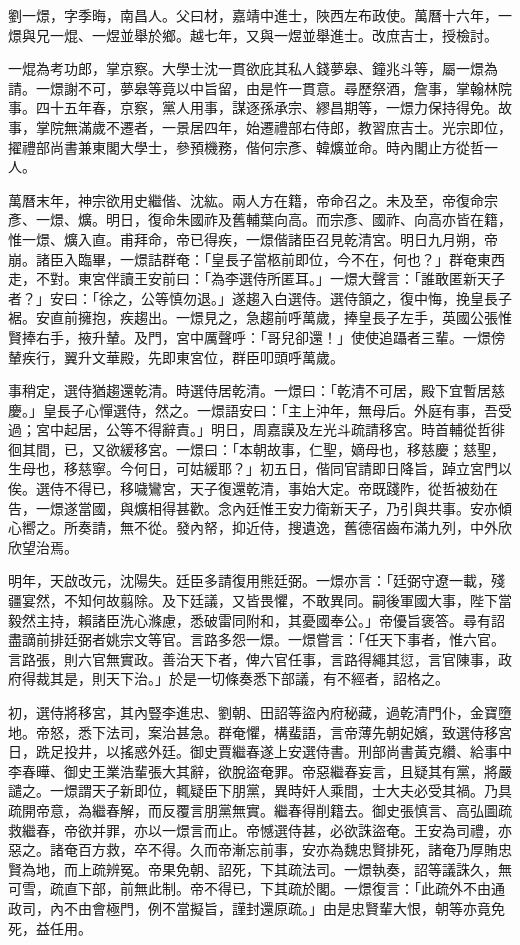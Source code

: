 \begin{pinyinscope}
劉一燝，字季晦，南昌人。父曰材，嘉靖中進士，陜西左布政使。萬曆十六年，一燝與兄一焜、一煜並舉於鄉。越七年，又與一煜並舉進士。改庶吉士，授檢討。

一焜為考功郎，掌京察。大學士沈一貫欲庇其私人錢夢皋、鐘兆斗等，屬一燝為請。一燝謝不可，夢皋等竟以中旨留，由是忤一貫意。尋歷祭酒，詹事，掌翰林院事。四十五年春，京察，黨人用事，謀逐孫承宗、繆昌期等，一燝力保持得免。故事，掌院無滿歲不遷者，一景居四年，始遷禮部右侍郎，教習庶吉士。光宗即位，擢禮部尚書兼東閣大學士，參預機務，偕何宗彥、韓爌並命。時內閣止方從哲一人。

萬曆末年，神宗欲用史繼偕、沈紘。兩人方在籍，帝命召之。未及至，帝復命宗彥、一燝、爌。明日，復命朱國祚及舊輔葉向高。而宗彥、國祚、向高亦皆在籍，惟一燝、爌入直。甫拜命，帝已得疾，一燝偕諸臣召見乾清宮。明日九月朔，帝崩。諸臣入臨畢，一燝詰群奄：「皇長子當柩前即位，今不在，何也？」群奄東西走，不對。東宮伴讀王安前曰：「為李選侍所匿耳。」一燝大聲言：「誰敢匿新天子者？」安曰：「徐之，公等慎勿退。」遂趨入白選侍。選侍頷之，復中悔，挽皇長子裾。安直前擁抱，疾趨出。一燝見之，急趨前呼萬歲，捧皇長子左手，英國公張惟賢捧右手，掖升輦。及門，宮中厲聲呼：「哥兒卻還！」使使追躡者三輩。一燝傍輦疾行，翼升文華殿，先即東宮位，群臣叩頭呼萬歲。

事稍定，選侍猶趨還乾清。時選侍居乾清。一燝曰：「乾清不可居，殿下宜暫居慈慶。」皇長子心憚選侍，然之。一燝語安曰：「主上沖年，無母后。外庭有事，吾受過；宮中起居，公等不得辭責。」明日，周嘉謨及左光斗疏請移宮。時首輔從哲徘徊其間，已，又欲緩移宮。一燝曰：「本朝故事，仁聖，嫡母也，移慈慶；慈聖，生母也，移慈寧。今何日，可姑緩耶？」初五日，偕同官請即日降旨，踔立宮門以俟。選侍不得已，移噦鸞宮，天子復還乾清，事始大定。帝既踐阼，從哲被劾在告，一燝遂當國，與爌相得甚歡。念內廷惟王安力衛新天子，乃引與共事。安亦傾心嚮之。所奏請，無不從。發內帑，抑近侍，搜遺逸，舊德宿齒布滿九列，中外欣欣望治焉。

明年，天啟改元，沈陽失。廷臣多請復用熊廷弼。一燝亦言：「廷弼守遼一載，殘疆宴然，不知何故翦除。及下廷議，又皆畏懼，不敢異同。嗣後軍國大事，陛下當毅然主持，賴諸臣洗心滌慮，悉破雷同附和，其憂國奉公。」帝優旨褒答。尋有詔盡謫前排廷弼者姚宗文等官。言路多怨一燝。一燝嘗言：「任天下事者，惟六官。言路張，則六官無實政。善治天下者，俾六官任事，言路得繩其愆，言官陳事，政府得裁其是，則天下治。」於是一切條奏悉下部議，有不經者，詔格之。

初，選侍將移宮，其內豎李進忠、劉朝、田詔等盜內府秘藏，過乾清門仆，金寶墮地。帝怒，悉下法司，案治甚急。群奄懼，構蜚語，言帝薄先朝妃嬪，致選侍移宮日，跣足投井，以搖惑外廷。御史賈繼春遂上安選侍書。刑部尚書黃克纘、給事中李春曄、御史王業浩輩張大其辭，欲脫盜奄罪。帝惡繼春妄言，且疑其有黨，將嚴譴之。一燝謂天子新即位，輒疑臣下朋黨，異時奸人乘間，士大夫必受其禍。乃具疏開帝意，為繼春解，而反覆言朋黨無實。繼春得削籍去。御史張慎言、高弘圖疏救繼春，帝欲并罪，亦以一燝言而止。帝憾選侍甚，必欲誅盜奄。王安為司禮，亦惡之。諸奄百方救，卒不得。久而帝漸忘前事，安亦為魏忠賢排死，諸奄乃厚賄忠賢為地，而上疏辨冤。帝果免朝、詔死，下其疏法司。一燝執奏，詔等議誅久，無可雪，疏直下部，前無此制。帝不得已，下其疏於閣。一燝復言：「此疏外不由通政司，內不由會極門，例不當擬旨，謹封還原疏。」由是忠賢輩大恨，朝等亦竟免死，益任用。


\end{pinyinscope}
